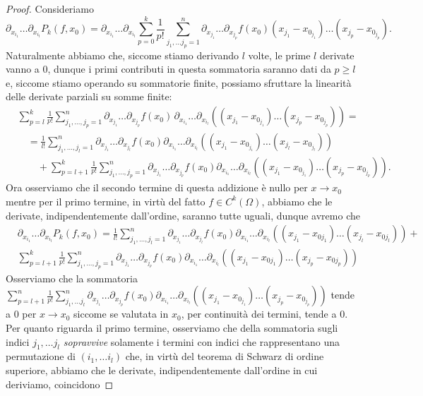 \begin{proof}
Consideriamo
$$
\partial_{x_{i_1}} \ldots \partial_{x_{i_l}} P_k(f, x_0) = \partial_{x_{i_1}} \ldots \partial_{x_{i_l}} \sum_{p=0}^{k} \frac{1}{p!} \sum_{j_1, \ldots j_p = 1}^n \partial_{x_{j_1}} \ldots \partial_{x_{j_p}} f(x_0)(x_{j_1} - x_{0_{j_1}}) \ldots (x_{j_p} - x_{0_{j_p}}).
$$
Naturalmente abbiamo che, siccome stiamo derivando $l$ volte, le prime $l$ derivate vanno a $0$, dunque i primi contributi in questa sommatoria saranno dati da $p \geq l$ e, siccome stiamo operando su sommatorie finite, possiamo sfruttare la linearità delle derivate parziali su somme finite:
\begin{align*}
&\sum_{p=l}^k \frac{1}{p!} \sum_{j_1, \ldots, j_p = 1}^n \partial_{x_{j_1}} \ldots \partial_{x_{j_p}} f(x_0) \, \partial_{x_{i_1}} \ldots \partial_{x_{i_l}} \left( (x_{j_1} - x_{0_{j_1}}) \ldots (x_{j_p} - x_{0_{j_p}}) \right) = \\
&\quad = \frac{1}{l!} \sum_{j_1, \ldots, j_l = 1}^n \partial_{x_{j_1}} \ldots \partial_{x_{j_l}} f(x_0) \partial_{x_{i_1}} \ldots \partial_{x_{i_l}} \left( (x_{j_1} - x_{0_{j_1}}) \ldots (x_{j_l} - x_{0_{j_l}}) \right) \\
&\quad\quad + \sum_{p=l+1}^k \frac{1}{p!} \sum_{j_1, \ldots, j_p = 1}^n \partial_{x_{j_1}} \ldots \partial_{x_{j_p}} f(x_0) \partial_{x_{i_1}} \ldots \partial_{x_{i_l}} \left( (x_{j_1} - x_{0_{j_1}}) \ldots (x_{j_p} - x_{0_{j_p}}) \right).
\end{align*}
Ora osserviamo che il secondo termine di questa addizione è nullo per $x \to x_0$ mentre per il primo termine, in virtù del fatto $f \in C^k (\Omega)$, abbiamo che le derivate, indipendentemente dall'ordine, saranno tutte uguali, dunque avremo che
\begin{align*}
&\partial_{x_{i_1}} \ldots \partial_{x_{i_l}} P_k(f, x_0) = \frac{1}{l!} \sum_{j_1, \ldots, j_l = 1}^n \partial_{x_{j_1}} \ldots \partial_{x_{j_l}} f(x_0) \partial_{x_{i_1}} \ldots \partial_{x_{i_l}} \left( (x_{j_1} - x_{0j_1}) \ldots (x_{j_l} - x_{0j_l}) \right) + \\
&\sum_{p=l+1}^k \frac{1}{p!} \sum_{j_1, \ldots, j_p = 1}^n \partial_{x_{j_1}} \ldots \partial_{x_{j_p}} f(x_0) \partial_{x_{i_1}} \ldots \partial_{x_{i_l}} \left( (x_{j_1} - x_{0j_1}) \ldots (x_{j_p} - x_{0j_p}) \right)
\end{align*}
Osserviamo che la sommatoria $\sum\limits_{p=l+1}^n \frac{1}{p!} \sum\limits_{j_1, \ldots j_l}^n \partial_{x_{j_1}} \ldots \partial_{x_{j_p}} f(x_0) \partial_{x_{i_1}} \ldots \partial_{x_{i_l}} \left( (x_{j_1} - x_{0_{j_1}}) \ldots (x_{j_p} - x_{0_{j_p}}) \right)$ tende a $0$ per $x \to x_0$ siccome se valutata in $x_0$, per continuità dei termini, tende a $0$. Per quanto riguarda il primo termine, osserviamo che della sommatoria sugli indici $j_1, \ldots j_l$ \emph{sopravvive} solamente i termini con indici che rappresentano una permutazione di $(i_1, \ldots i_l)$ che, in virtù del teorema di Schwarz di ordine superiore, abbiamo che le derivate, indipendentemente dall'ordine in cui deriviamo, coincidono

\end{proof}
